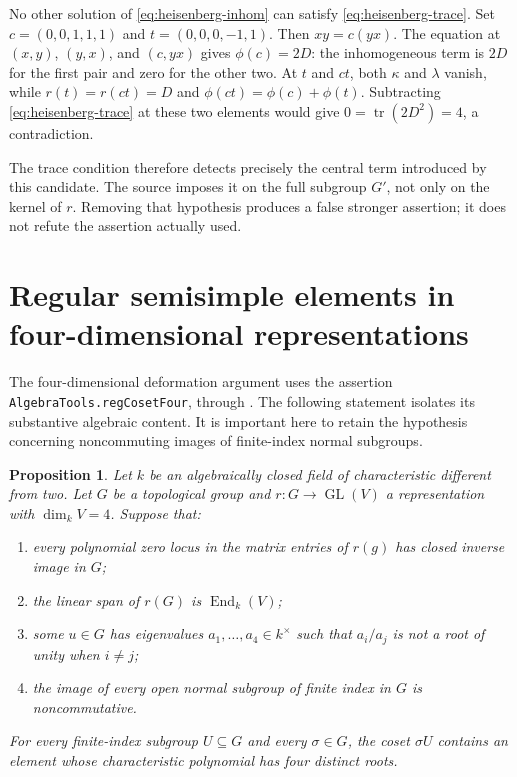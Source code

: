 \documentclass[11pt,a4paper]{article}
\newtheorem{proposition}{Proposition}[section]
\theoremstyle{remark}
\newcommand{\src}[1]{\cite{#1}}
\newcommand{\code}[1]{\texttt{#1}}
\begin{document}
No other solution of \eqref{eq:heisenberg-inhom} can satisfy
\eqref{eq:heisenberg-trace}. Set $c=(0,0,1,1,1)$ and
$t=(0,0,0,-1,1)$. Then $xy=c(yx)$. The equation at $(x,y)$,
$(y,x)$, and $(c,yx)$ gives $\phi(c)=2D$: the inhomogeneous term
is $2D$ for the first pair and zero for the other two.
At $t$ and $ct$, both $\kappa$ and $\lambda$ vanish, while
$r(t)=r(ct)=D$ and $\phi(ct)=\phi(c)+\phi(t)$.
Subtracting \eqref{eq:heisenberg-trace} at these two elements
would give $0=\operatorname{tr}(2D^2)=4$, a contradiction.

The trace condition therefore detects precisely the central term
introduced by this candidate. The source imposes it on the full
subgroup $G'$, not only on the kernel of $r$. Removing that
hypothesis produces a false stronger assertion; it does not
refute the assertion actually used.

\src{S-detector-continued}

\section{Regular semisimple elements in four-dimensional representations}
\label{sec:regular-cosets}

The four-dimensional deformation argument uses the assertion
\code{AlgebraTools.regCosetFour}, through
.
The following statement isolates its substantive algebraic content.
It is important here to retain the hypothesis concerning
noncommuting images of finite-index normal subgroups.

\begin{proposition}\label{prop:regular-cosets}
Let $k$ be an algebraically closed field of characteristic different
from two. Let $G$ be a topological group and
$r:G\to\operatorname{GL}(V)$ a representation with $\dim_kV=4$.
Suppose that:
\begin{enumerate}
\item every polynomial zero locus in the matrix entries of $r(g)$
has closed inverse image in $G$;
\item the linear span of $r(G)$ is $\operatorname{End}_k(V)$;
\item some $u\in G$ has eigenvalues $a_1,\ldots,a_4\in k^\times$
such that $a_i/a_j$ is not a root of unity when $i\ne j$;
\item the image of every open normal subgroup of finite index in
$G$ is noncommutative.
\end{enumerate}
For every finite-index subgroup $U\subseteq G$ and every $\sigma\in G$,
the coset $\sigma U$ contains an element whose characteristic
polynomial has four distinct roots.
\end{proposition}
\end{document}
